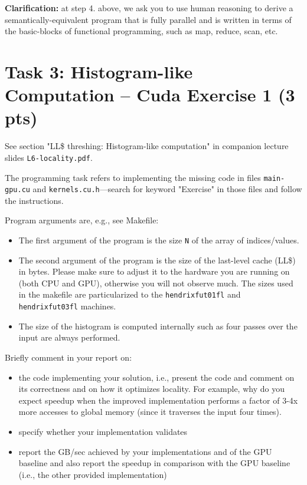 \documentclass{article}
\begin{document}
\textbf{Clarification:} at step 4. above, we ask you to use human reasoning to
derive a semantically-equivalent program that is fully parallel and is written
in terms of the basic-blocks of functional programming, such as map, reduce, scan, etc. 

\section{Task 3: Histogram-like Computation -- Cuda Exercise 1 (3 pts)}

See section "LL\$ threshing: Histogram-like computation" in companion lecture slides \texttt{L6-locality.pdf}.

The programming task refers to implementing the missing code in files \texttt{main-gpu.cu} and \texttt{kernels.cu.h}---search for keyword "Exercise" in those files and follow the instructions.

Program arguments are, e.g., see Makefile:

\begin{itemize}
    \item The first argument of the program is the size \texttt{N} of the array of indices/values. 
    \item The second argument of the program is the size of the last-level cache (LL\$) in bytes. Please make sure to adjust it to the hardware you are running on (both CPU and GPU), otherwise you will not observe much. The sizes used in the makefile are particularized to the \texttt{hendrixfut01fl} and \texttt{hendrixfut03fl} machines.
    \item The size of the histogram is computed internally such as four passes over the input are always performed.
\end{itemize}

Briefly comment in your report on:

\begin{itemize}
    \item the code implementing your solution, i.e., present
    the code and comment on its correctness and on
    how it optimizes locality. For example, why do
    you expect speedup when the improved implementation
    performs a factor of 3-4x more accesses to global memory
    (since it traverses the input four times).
    \item specify whether your implementation validates
    \item report the GB/sec achieved by your implementations and of the GPU baseline
    and also report the speedup in comparison with the GPU baseline
    (i.e., the other provided implementation)
\end{itemize}
\end{document}
